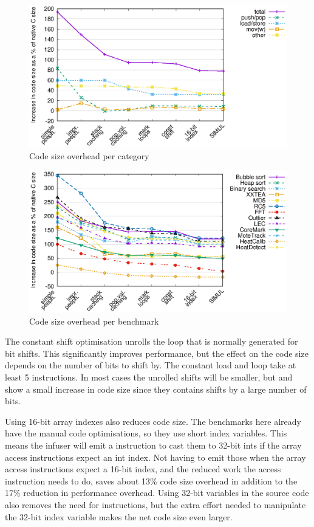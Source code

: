 \begin{figure}
\centering
\includegraphics[width=\mygraphsize]{codesizeoverhead-per-opcode-category.eps}
\caption{Code size overhead per category}
\label{fig-codesize-per-opcode-category}
\end{figure}

\begin{figure}
\centering
\includegraphics[width=\mygraphsize]{codesizeoverhead-per-benchmark.eps}
\caption{Code size overhead per benchmark}
\label{fig-codesize-per-benchmark}
\end{figure}

The constant shift optimisation unrolls the loop that is normally generated for bit shifts. This significantly improves performance, but the effect on the code size depends on the number of bits to shift by. The constant load and loop take at least 5 instructions. In most cases the unrolled shifts will be smaller, but  and  show a small increase in code size since they contains shifts by a large number of bits.

Using 16-bit array indexes also reduces code size. The benchmarks here already have the manual code optimisations, so they use short index variables. This means the infuser will emit a  instruction to cast them to 32-bit ints if the array access instructions expect an int index. Not having to emit those when the array access instructions expect a 16-bit index, and the reduced work the access instruction needs to do, saves about 13\% code size overhead in addition to the 17\% reduction in performance overhead. Using 32-bit variables in the source code also removes the need for  instructions, but the extra effort needed to manipulate the 32-bit index variable makes the net code size even larger.

